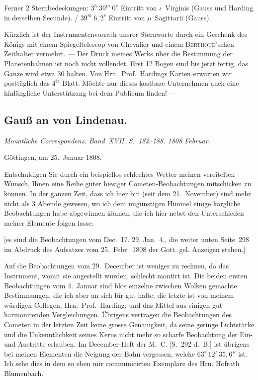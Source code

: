 \documentclass[12pt,a4paper]{book}
\begin{document}
Ferner 2 Sternbedeckungen: $3^{h}\ 39^{m}\ 0^{s}$ Eintritt von $\iota$~Virginis (Gauss und Harding in derselben Secunde). / $39^{m}\ 6{,}2^{s}$ Eintritt von $\mu$~Sagittarii (Gauss).

K\"urzlich ist der Instrumentenvorrath unsrer Sternwarte durch ein Geschenk des K\"onigs mit einem Spiegeltelescop von Chevalier und einem \textsc{Berthoud}'schen Zeithalter vermehrt. --- Der Druck meines Werks \"uber die Bestimmung der Planetenbahnen ist noch nicht vollendet. Erst 12 Bogen sind bis jetzt fertig, das Ganze wird etwa 30 halten. Von Hrn.~Prof.~Hardings Karten erwarten wir postt\"aglich das $4^{\text{te}}$ Blatt. M\"ochte nur dieses kostbare Unternehmen auch eine hinl\"angliche Unterst\"utzung bei dem Publicum finden! ---


\newpage
\subsection*{Gau{\ss} an von Lindenau.}

\textit{Monatliche Correspondenz. Band~XVII. S.~182--188. 1808 Februar.}

G\"ottingen, am 25.~Januar 1808.

Entschuldigen Sie durch ein beispiellos schlechtes Wetter meinen vereitelten Wunsch, Ihnen eine Reihe guter hiesiger Cometen-Beobachtungen mitschicken zu k\"onnen. In der ganzen Zeit, dass ich hier bin (seit dem 21.~November) sind mehr nicht als 3 Abende gewesen, wo ich dem ung\"unstigen Himmel einige k\"argliche Beobachtungen habe abgewinnen k\"onnen, die ich hier nebst den Unterschieden meiner Elemente folgen lasse:

[es sind die Beobachtungen vom Dec.~17. 29. Jan.~4., die weiter unten Seite~298 im Abdruck des Aufsatzes vom 25.~Febr.~1808 der Gott. gel. Anzeigen stehen.]

Auf die Beobachtungen vom 29.~December ist weniger zu rechnen, da das Instrument, womit sie angestellt wurden, schlecht montirt ist. Die beiden ersten Beobachtungen vom 4.~Januar sind blos einzelne zwischen Wolken gemachte Bestimmungen, die ich aber an sich f\"ur gut halte; die letzte ist von meinem w\"urdigen Collegen, Hrn.~Prof.~Harding, und das Mittel aus einigen gut harmonirenden Vergleichungen. \"Ubrigens vertragen die Beobachtungen des Cometen in der letzten Zeit keine grosse Genauigkeit, da seine geringe Lichtst\"arke und die Unkenntlichkeit seines Kerns nicht mehr so scharfe Beobachtung der Ein- und Austritte erlauben. Im December-Heft der M.~C. [S.~292 d.~B.] ist \"ubrigens bei meinen Elementen die Neigung der Bahn vergessen, welche $63^{\circ}\ 12'\ 35{,}6''$ ist. Ich sehe dies in dem so eben mir communicirten Exemplare des Hrn. Hofrath Blumenbach.
\end{document}
